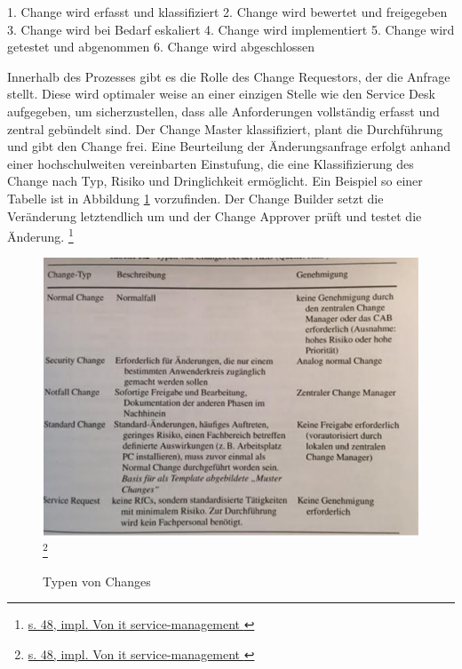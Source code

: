 1.	Change wird erfasst und klassifiziert
2.	Change wird bewertet und freigegeben
3.	Change wird bei Bedarf eskaliert
4.	Change wird implementiert
5.	Change wird getestet und abgenommen
6.	Change wird abgeschlossen

Innerhalb des Prozesses gibt es die Rolle des Change Requestors, der die Anfrage stellt. Diese wird optimaler weise an einer einzigen Stelle wie den Service Desk aufgegeben, um sicherzustellen, dass alle Anforderungen vollständig erfasst und zentral gebündelt sind. Der Change Master klassifiziert, plant die Durchführung und gibt den Change frei. Eine Beurteilung der Änderungsanfrage erfolgt anhand einer hochschulweiten vereinbarten Einstufung, die eine Klassifizierung des Change nach Typ, Risiko und Dringlichkeit ermöglicht. Ein Beispiel so einer Tabelle ist in Abbildung \ref{fig_typenvonchange} vorzufinden. Der Change Builder setzt die Veränderung letztendlich um und der Change Approver prüft und testet die Änderung. \footnote{\url{s. 48, impl. Von it service-management }}
 
\begin{figure}[h!]
	\centering
	\includegraphics[width=15cm]{kapitel/gruppe1_2/bilder/typen_von_changes} 
	\footnote{\url{s. 48, impl. Von it service-management }}
	\caption{Typen von Changes}
	\label{fig_typenvonchange}
\end{figure}




